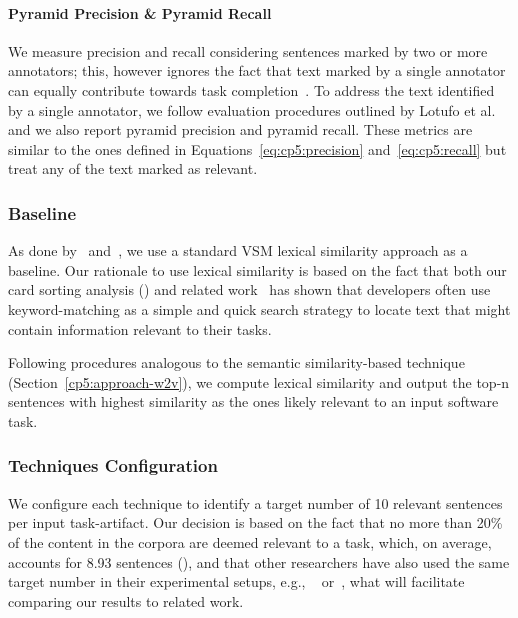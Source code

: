 \paragraph{\textbf{Pyramid Precision \& Pyramid Recall}} 

We measure precision and recall considering sentences marked by two or more annotators; this, however ignores the fact that text marked by a single annotator can equally contribute towards task completion~\cite{marques2020}. To address the text identified by a single annotator, we 
follow evaluation procedures outlined by Lotufo et al.~\cite{Lotufo2012} and we
also report pyramid precision and pyramid recall. These metrics are similar to the ones defined in 
Equations~\ref{eq:cp5:precision} and~\ref{eq:cp5:recall} but treat any of the text marked as relevant.






\subsubsection{Baseline}


As done by~\cite{Lin2021} and~\cite{Ye2016}, we use a standard VSM lexical similarity approach as a baseline. Our rationale to use 
lexical similarity is based on the fact that 
both our card sorting analysis () and related work~\cite{Ko2006a, Freund2015} has shown that developers often use keyword-matching as a simple and quick search strategy to locate text that might contain information relevant to their tasks.


Following procedures analogous to the semantic similarity-based technique (Section~\ref{cp5:approach-w2v}), we compute lexical similarity and output the top-n sentences with highest similarity as the ones likely relevant to an input software task.




\subsubsection{Techniques Configuration}



We configure each technique to identify a target number of 10 relevant sentences per input task-artifact.
Our decision is based on the fact that 
no more than 20\% of the content in the corpora are deemed relevant to a task, which, on average, accounts for 8.93 sentences (),
and that other researchers have also used the same target number in their experimental setups, e.g., ~\cite{Xu2017} or~\cite{Lotufo2012},
what will facilitate comparing our results to related work.




